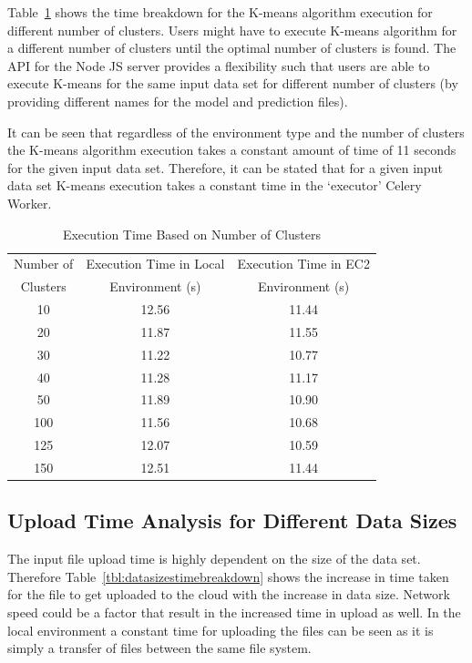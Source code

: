 Table~\ref{tbl:clustertimebreakdown} shows the time breakdown for the K-means 
algorithm execution for different number of clusters. Users might have to 
execute K-means algorithm for a different number of clusters until the optimal 
number of clusters is found. The API for the Node JS server provides a 
flexibility such that users are able to execute K-means for the same input 
data set for different number of clusters (by providing different names for 
the model and prediction files).

It can be seen that regardless of the environment type and the number of 
clusters the K-means algorithm execution takes a constant amount of time of 11 
seconds for the given input data set. Therefore, it can be stated that for a 
given input data set K-means execution takes a constant time in the `executor' 
Celery Worker.

\begin{table}[htbp]
	\centering
	\caption{Execution Time Based on Number of 
	Clusters}\label{tbl:clustertimebreakdown}
	\begin{tabular}{*{3}{c}}
		\toprule
		Number of & Execution Time in Local & Execution Time in EC2 \\
		Clusters & Environment (s) & Environment (s) \\
		\midrule
		10  &   12.56       &    11.44     \\ \midrule
		20  &   11.87       &    11.55     \\ \midrule
		30  &   11.22       &    10.77     \\ \midrule
		40  &   11.28       &    11.17     \\ \midrule
		50  &   11.89       &    10.90     \\ \midrule
		100 &   11.56       &    10.68     \\ \midrule
		125 &   12.07       &    10.59     \\ \midrule
		150 &   12.51       &    11.44     \\
		\bottomrule
	\end{tabular}
\end{table}

\subsection{Upload Time Analysis for Different Data Sizes}

The input file upload time is highly dependent on the size of the data set. 
Therefore Table~\ref{tbl:datasizestimebreakdown} shows the increase in time 
taken for the file to get uploaded to the cloud with the increase in data 
size. Network speed could be a factor that result in the increased time in 
upload as well. In the local environment a constant time for uploading the 
files can be seen as it is simply a transfer of files between the same file 
system.
 
